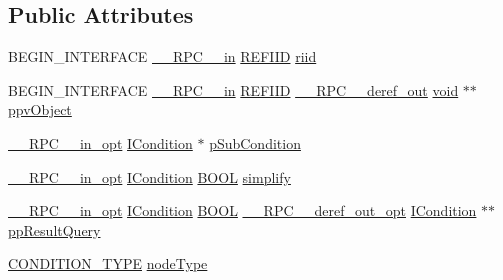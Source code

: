 \subsection*{Public Attributes}
\begin{DoxyCompactItemize}
\item 
B\+E\+G\+I\+N\+\_\+\+I\+N\+T\+E\+R\+F\+A\+CE \hyperlink{rpcsal_8h_a20b7f6da600a05c8b541659f14f7f0e6}{\+\_\+\+\_\+\+R\+P\+C\+\_\+\+\_\+in} \hyperlink{px__win__ds_8c_a80ec49c8ae61e234197d5071d2df497d}{R\+E\+F\+I\+ID} \hyperlink{struct_i_query_solution_vtbl_a7ed76986d2af923fb7c3383c34a44204}{riid}
\item 
B\+E\+G\+I\+N\+\_\+\+I\+N\+T\+E\+R\+F\+A\+CE \hyperlink{rpcsal_8h_a20b7f6da600a05c8b541659f14f7f0e6}{\+\_\+\+\_\+\+R\+P\+C\+\_\+\+\_\+in} \hyperlink{px__win__ds_8c_a80ec49c8ae61e234197d5071d2df497d}{R\+E\+F\+I\+ID} \hyperlink{rpcsal_8h_a23bc188526f10656f9c79d950f6c3192}{\+\_\+\+\_\+\+R\+P\+C\+\_\+\+\_\+deref\+\_\+out} \hyperlink{sound_8c_ae35f5844602719cf66324f4de2a658b3}{void} $\ast$$\ast$ \hyperlink{struct_i_query_solution_vtbl_a7b7925aac3252d89c5d16423a4005ba3}{ppv\+Object}
\item 
\hyperlink{rpcsal_8h_a6e152ac84637d70f0453366759b3b9fb}{\+\_\+\+\_\+\+R\+P\+C\+\_\+\+\_\+in\+\_\+opt} \hyperlink{structuredquery_8h_a44e1be344248ef67d647837c4aae42fa}{I\+Condition} $\ast$ \hyperlink{struct_i_query_solution_vtbl_ae4602e4ad5aefeae2a8a1b29cd076a11}{p\+Sub\+Condition}
\item 
\hyperlink{rpcsal_8h_a6e152ac84637d70f0453366759b3b9fb}{\+\_\+\+\_\+\+R\+P\+C\+\_\+\+\_\+in\+\_\+opt} \hyperlink{structuredquery_8h_a44e1be344248ef67d647837c4aae42fa}{I\+Condition} \hyperlink{nfilterkit_8h_a3be13892ae7076009afcf121347dd319}{B\+O\+OL} \hyperlink{struct_i_query_solution_vtbl_aece12987e254b027c2aca1de396b77b7}{simplify}
\item 
\hyperlink{rpcsal_8h_a6e152ac84637d70f0453366759b3b9fb}{\+\_\+\+\_\+\+R\+P\+C\+\_\+\+\_\+in\+\_\+opt} \hyperlink{structuredquery_8h_a44e1be344248ef67d647837c4aae42fa}{I\+Condition} \hyperlink{nfilterkit_8h_a3be13892ae7076009afcf121347dd319}{B\+O\+OL} \hyperlink{rpcsal_8h_ab29e89ceb0eb0b075c6f6299b0de6a21}{\+\_\+\+\_\+\+R\+P\+C\+\_\+\+\_\+deref\+\_\+out\+\_\+opt} \hyperlink{structuredquery_8h_a44e1be344248ef67d647837c4aae42fa}{I\+Condition} $\ast$$\ast$ \hyperlink{struct_i_query_solution_vtbl_ad82600a4bf3c7d012e27712e97cce4d6}{pp\+Result\+Query}
\item 
\hyperlink{structuredquery_8h_afbbe55e1cea689df1b4eadd5be61ca43}{C\+O\+N\+D\+I\+T\+I\+O\+N\+\_\+\+T\+Y\+PE} \hyperlink{struct_i_query_solution_vtbl_a99af4fb9246f42d7deb9c71f877ba198}{node\+Type}

\end{DoxyCompactItemize}
